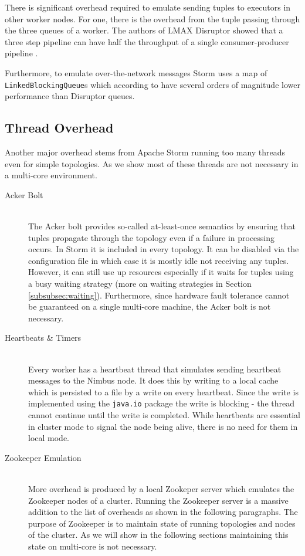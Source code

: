 \documentclass[bsc,deptreport,twoside,singlespacing,normalheadings,parskip]{infthesis}\usepackage[]{graphicx}\usepackage[]{color}
\begin{document}
There is significant overhead required to emulate sending tuples to executors in other worker nodes. For one, there is the overhead from the tuple passing through the three queues of a worker. The authors of LMAX Disruptor showed that a three step pipeline can have half the throughput of a single consumer-producer pipeline \citep{DisruptorWiki}.

Furthermore, to emulate over-the-network messages Storm uses a map of \\ \texttt{LinkedBlockingQueue}s which according to \cite{Thompson_Farley_Barker_Gee_Stewart_2011} have several orders of magnitude lower performance than Disruptor queues.

\subsection{Thread Overhead}

Another major overhead stems from Apache Storm running too many threads even for simple topologies. As we show most of these threads are not necessary in a multi-core environment.

\begin{description}
	\item[Acker Bolt] \hfill \\
	The Acker bolt provides so-called at-least-once semantics by ensuring that tuples propagate through the topology even if a failure in processing occurs. In Storm it is included in every topology. It can be disabled via the configuration file in which case it is mostly idle not receiving any tuples. However, it can still use up resources especially if it waits for tuples using a busy waiting strategy (more on waiting strategies in Section \ref{subsubsec:waiting}). Furthermore, since hardware fault tolerance cannot be guaranteed on a single multi-core machine, the Acker bolt is not necessary.
	\item[Heartbeats \& Timers] \hfill \\
	Every worker has a heartbeat thread that simulates sending heartbeat messages to the Nimbus node. It does this by writing to a local cache which is persisted to a file by a write on every heartbeat. Since the write is implemented using the \texttt{java.io} package the write is blocking - the thread cannot continue until the write is completed. While heartbeats are essential in cluster mode to signal the node being alive, there is no need for them in local mode.
	\item[Zookeeper Emulation] \hfill \\
	More overhead is produced by a local Zookeper server which emulates the Zookeeper nodes of a cluster. Running the Zookeeper server is a massive addition to the list of overheads as shown in the following paragraphs. The purpose of Zookeeper is to maintain state of running topologies and nodes of the cluster. As we will show in the following sections maintaining this state on multi-core is not necessary.
\end{description}
\end{document}
